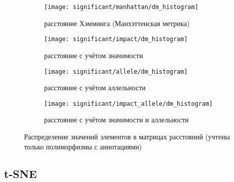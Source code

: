 \documentclass[main.tex]{subfiles}
\begin{document}
\begin{figure}[H]
    \centering
    \begin{subfigure}{.5\textwidth}
        \centering
        \texttt{[image: significant/manhattan/dm\_histogram]}
        \captionsetup{width=.8\linewidth}
        \caption{расстояние Хэмминга (Ман\-хэт\-тенская метрика)}
        \label{fig:hist_manh}
    \end{subfigure}%
    \begin{subfigure}{.5\textwidth}
        \centering
        \texttt{[image: significant/impact/dm\_histogram]}
        \captionsetup{width=.8\linewidth}
        \caption{расстояние с учётом значимости}
        \label{fig:hist_impact}
    \end{subfigure}

    \begin{subfigure}{.5\textwidth}
        \centering
        \texttt{[image: significant/allele/dm\_histogram]}
        \captionsetup{width=.8\linewidth}
        \caption{расстояние с учётом аллельности}
        \label{fig:hist_allele}
    \end{subfigure}%
    \begin{subfigure}{.5\textwidth}
        \centering
        \texttt{[image: significant/impact\_allele/dm\_histogram]}
        \captionsetup{width=.8\linewidth}
        \caption{расстояние с учётом значимости и аллельности}
        \label{fig:hist_impact_allele}
    \end{subfigure}
    \caption{Распределение значений элементов в матрицах расстояний (учтены только полиморфизмы с аннотациями)}
\end{figure}

\subsection{t-SNE}
\end{document}
